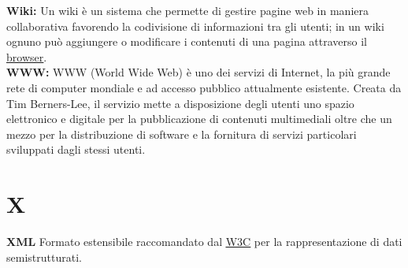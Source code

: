 \hypertarget{wiki}{}
\textbf{Wiki:}
Un wiki \`e un sistema che permette di gestire pagine web in maniera collaborativa favorendo la codivisione di informazioni tra gli utenti; in un wiki ognuno pu\`o aggiungere o modificare i contenuti di una pagina attraverso il \hyperlink{browser}{\underline{browser}}.\\

\hypertarget{www}{}
\textbf{WWW:}
WWW (World Wide Web) \`e uno dei servizi di Internet, la pi\`u grande rete di computer mondiale e ad accesso pubblico attualmente esistente.
Creata da Tim Berners-Lee, il servizio mette a disposizione degli utenti uno spazio elettronico e digitale per la pubblicazione di contenuti multimediali oltre che un mezzo per la distribuzione di software e la fornitura di servizi particolari sviluppati dagli stessi utenti. \\

\section*{X}
\hypertarget{xml}{}
\textbf{XML}
\text Formato estensibile raccomandato dal \hyperlink{w3c}{\underline{W3C}} per la rappresentazione di dati semistrutturati.\\


